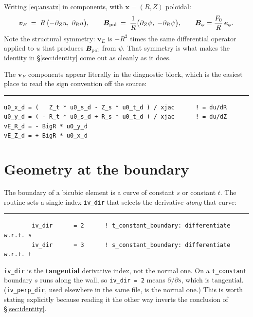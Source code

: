 \documentclass[11pt,a4paper]{article}
\newenvironment{codeline}[1]
  {\par\medskip\noindent\textcolor{coderule}{\rule{\linewidth}{0.4pt}}\par
   \nopagebreak\noindent{\ttfamily\footnotesize\textcolor{keyc}{#1}}\par\nopagebreak\smallskip}
  {\par\medskip}
\newcommand{\code}[1]{\texttt{\small #1}}
\newcommand{\vE}{\bm{v}_E}
\newcommand{\eph}{\bm{e}_\varphi}
\begin{document}
Writing \eqref{eq:ansatz} in components, with $\bm{x}=(R,Z)$ poloidal:
\begin{equation}
  \vE \;=\; R\,\bigl(-\partial_Z u,\; \partial_R u\bigr),
  \qquad
  \bm{B}_{\rm pol} \;=\; \frac{1}{R}\bigl(\partial_Z\psi,\;-\partial_R\psi\bigr),
  \qquad
  \bm{B}_\varphi = \frac{F_0}{R}\,\eph .
  \label{eq:components}
\end{equation}
Note the structural symmetry: $\vE$ is $-R^2$ times the same differential operator applied to
$u$ that produces $\bm{B}_{\rm pol}$ from $\psi$.  That symmetry is what makes the identity in
\S\ref{sec:identity} come out as cleanly as it does.

The $\vE$ components appear literally in the diagnostic block, which is the easiest place to
read the sign convention off the source:

\begin{codeline}{mod\_boundary\_conditions.f90:637--641}
\begin{lstlisting}
u0_x_d = (   Z_t * u0_s_d - Z_s * u0_t_d ) / xjac      ! = du/dR
u0_y_d = ( - R_t * u0_s_d + R_s * u0_t_d ) / xjac      ! = du/dZ
vE_R_d = - BigR * u0_y_d
vE_Z_d = + BigR * u0_x_d
\end{lstlisting}
\end{codeline}

\section{Geometry at the boundary}

The boundary of a bicubic element is a curve of constant $s$ or constant $t$.  The routine
sets a single index \code{iv\_dir} that selects the derivative \emph{along} that curve:

\begin{codeline}{mod\_boundary\_conditions.f90:254, 259}
\begin{lstlisting}
        iv_dir      = 2      ! t_constant_boundary: differentiate w.r.t. s
        iv_dir      = 3      ! s_constant_boundary: differentiate w.r.t. t
\end{lstlisting}
\end{codeline}

\begin{keybox}
\code{iv\_dir} is the \textbf{tangential} derivative index, not the normal one.  On a
\code{t\_constant} boundary $s$ runs along the wall, so \code{iv\_dir = 2} means
$\partial/\partial s$, which is tangential.  (\code{iv\_perp\_dir}, used elsewhere in the same
file, is the normal one.)  This is worth stating explicitly because reading it the other way
inverts the conclusion of \S\ref{sec:identity}.
\end{keybox}
\end{document}
